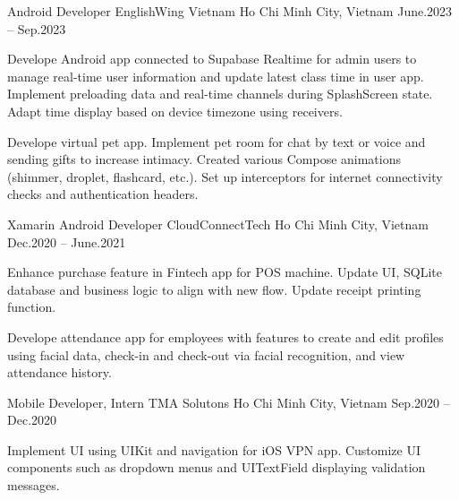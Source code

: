 \begin{cventries}
    \cventry
    {Android Developer}
    {EnglishWing Vietnam}
    {Ho Chi Minh City, Vietnam}
    {June.2023 -- Sep.2023}
    {
        \begin{cvitems}
            \item {
                Develope Android app connected to Supabase Realtime for admin users to manage real-time user information and update latest class time in user app.
                Implement preloading data and real-time channels during SplashScreen state.
                Adapt time display based on device timezone using receivers.
            }
            \item {
                Develope virtual pet app.
                Implement pet room for chat by text or voice and sending gifts to increase intimacy.
                Created various Compose animations (shimmer, droplet, flashcard, etc.).
                Set up interceptors for internet connectivity checks and authentication headers.
            }
        \end{cvitems}
    }

    \cventry
    {Xamarin Android Developer}
    {CloudConnectTech}
    {Ho Chi Minh City, Vietnam}
    {Dec.2020 -- June.2021}
    {
        \begin{cvitems}
            \item {
                Enhance purchase feature in Fintech app for POS machine.
                Update UI, SQLite database and business logic to align with new flow.
                Update receipt printing function.
            }
            \item {
                Develope attendance app for employees with features to create and edit profiles using facial data,
                check-in and check-out via facial recognition,
                and view attendance history.
            }
        \end{cvitems}
    }

    \cventry
    {Mobile Developer, Intern}
    {TMA Solutons}
    {Ho Chi Minh City, Vietnam}
    {Sep.2020 -- Dec.2020}
    {
        \begin{cvitems}
            \item {
                Implement UI using UIKit and navigation for iOS VPN app.
                Customize UI components such as dropdown menus and UITextField displaying validation messages.
            }
        \end{cvitems}
    }

\end{cventries}
